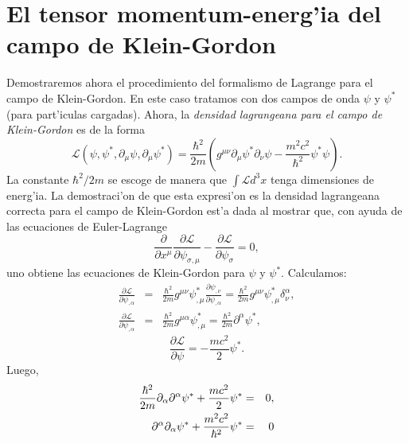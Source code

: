 \section{El tensor momentum-energ'ia del campo de Klein-Gordon}

Demostraremos ahora el procedimiento del formalismo de Lagrange para el
campo de Klein-Gordon. En este caso tratamos con dos campos de onda $\psi $
y $\psi ^{\ast }$ (para part'iculas cargadas). Ahora, la \emph{densidad
lagrangeana para el campo de Klein-Gordon} es de la forma 
\begin{equation}
\mathcal{L}\left( \psi ,\psi ^{\ast },\partial _{\mu }\psi ,\partial _{\mu
}\psi ^{\ast }\right) =\frac{\hbar ^{2}}{2m}\left( g^{\mu \nu }\partial
_{\mu }\psi ^{\ast }\partial _{\nu }\psi -\frac{m^{2}c^{2}}{\hbar ^{2}}%
\psi ^{\ast }\psi \right) . \label{LagKG}
\end{equation}
La constante $\hbar ^{2}/2m$ se escoge de manera que $\int \mathcal{L}%
d^{3}x$ tenga dimensiones de energ'ia. La demostraci'on de que esta
expresi'on es la densidad lagrangeana correcta para el campo de
Klein-Gordon est'a dada al mostrar que, con ayuda de las ecuaciones de
Euler-Lagrange 
\begin{equation}
\frac{\partial }{\partial x^{\mu }}\frac{\partial \mathcal{L}}{\partial \psi
_{\sigma ,\mu }}-\frac{\partial \mathcal{L}}{\partial \psi _{\sigma }}=0,
\end{equation}
uno obtiene las ecuaciones de Klein-Gordon para $\psi $ y $\psi ^{\ast }$.
Calculamos: 
\begin{eqnarray*}
\frac{\partial \mathcal{L}}{\partial \psi _{,\alpha }} &=&\frac{\hbar ^{2}%
}{2m}g^{\mu \nu }\psi _{,\mu }^{\ast }\frac{\partial \psi _{,\nu }}{\partial
\psi _{,\alpha }}=\frac{\hbar ^{2}}{2m}g^{\mu \nu }\psi _{,\mu }^{\ast
}\delta _{\nu }^{\alpha }, \\
\frac{\partial \mathcal{L}}{\partial \psi _{,\alpha }} &=&\frac{\hbar ^{2}%
}{2m}g^{\mu \alpha }\psi _{,\mu }^{\ast }=\frac{\hbar ^{2}}{2m}\partial
^{\alpha }\psi ^{\ast },
\end{eqnarray*}
\begin{equation}
\frac{\partial \mathcal{L}}{\partial \psi }=-\frac{mc^{2}}{2}\psi ^{\ast }.
\end{equation}
Luego, 
\begin{eqnarray*}
\frac{\hbar ^{2}}{2m}\partial _{\alpha }\partial ^{\alpha }\psi ^{\ast }+%
\frac{mc^{2}}{2}\psi ^{\ast } &=&0, \\
\partial ^{\alpha }\partial _{\alpha }\psi ^{\ast }+\frac{m^{2}c^{2}}{%
\hbar ^{2}}\psi ^{\ast } &=&0
\end{eqnarray*}


